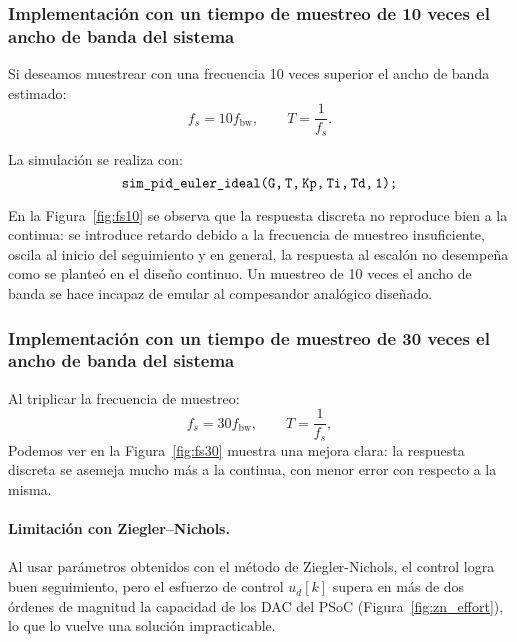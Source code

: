 
\subsubsection{ Implementación con un tiempo de muestreo de 10 veces el ancho de banda del sistema
}


Si deseamos muestrear con una frecuencia 10 veces superior el ancho de banda estimado:
\[
f_s = 10 f_{\mathrm{bw}}, \qquad T = \frac{1}{f_s}.
\]

La simulación se realiza con:
\[
\texttt{sim\_pid\_euler\_ideal(G,\,T,\,Kp,\,Ti,\,Td,\,1);}
\]

En la Figura~\ref{fig:fs10} se observa que la respuesta discreta no reproduce bien a la continua: se introduce retardo debido a la frecuencia de muestreo insuficiente, oscila al inicio del seguimiento y en general, la respuesta al escalón no desempeña como se planteó en el diseño continuo.
Un muestreo de 10 veces el ancho de banda se hace incapaz de emular al compesandor analógico diseñado.







\subsubsection{ Implementación con un tiempo de muestreo de 30 veces el ancho de banda del sistema
}

Al triplicar la frecuencia de muestreo:
\[
f_s = 30 f_{\mathrm{bw}}, \qquad T = \frac{1}{f_s},
\]
Podemos ver en la Figura~\ref{fig:fs30} muestra una mejora clara: la respuesta discreta se asemeja mucho más a la continua, con menor error con respecto a la misma.


\paragraph{Limitación con Ziegler--Nichols.}  
Al usar parámetros obtenidos con el método de Ziegler-Nichols, el control logra buen seguimiento, pero el esfuerzo de control $u_d[k]$ supera en más de dos órdenes de magnitud la capacidad de los DAC del PSoC (Figura~\ref{fig:zn_effort}), lo que lo vuelve una solución impracticable.


